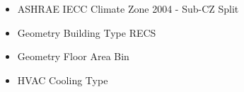 \begin{itemize}
\item ASHRAE IECC Climate Zone 2004 - Sub-CZ Split
\item Geometry Building Type RECS
\item Geometry Floor Area Bin
\item HVAC Cooling Type
\end{itemize}

